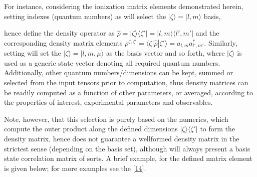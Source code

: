 \documentclass[letterpaper,table,10pt,english]{jupyterBook}
\begin{document}
\sphinxAtStartPar
For instance, considering the ionization matrix elements demonstrated herein, setting indexes (quantum numbers) as \sphinxcode{\sphinxupquote{{[}l,m{]}}} will select the \(|\zeta\rangle = |l,m\rangle\) basis,

\sphinxAtStartPar
hence define the density operator as \(\hat{\rho} = |\zeta\rangle \langle\zeta'| = |l,m\rangle\langle l',m'|\) and the corresponding density matrix elements \(\rho^{\zeta,\zeta'}=\langle\zeta|\hat{\rho}|\zeta'\rangle=a_{l,m}a_{l',m'}^{*}\). Similarly, setting \sphinxcode{\sphinxupquote{{[}'l','m','mu'{]}}} will set the \(|\zeta\rangle = |l,m,\mu\rangle\) as the basis vector and so forth, where \(|\zeta\rangle\) is used as a generic state vector denoting all required quantum numbers. Additionally, other quantum numbers/dimensions can be kept, summed or selected from the input tensors prior to computation, thus density matrices can be readily computed as a function of other parameters, or averaged, according to the properties of interest, experimental parameters and observables.

\sphinxAtStartPar
Note, however, that this selection is purely based on the numerics, which compute the outer product along the defined dimensions \(|\zeta\rangle\langle\zeta'|\) to form the density matrix, hence does not guarantee a well\sphinxhyphen{}formed density matrix in the strictest sense (depending on the basis set), although will always present a basis state correlation matrix of sorts. A brief example, for the  defined matrix element is given below; for more examples see the  {[}\hyperlink{cite.backmatter/bibliography:id506}{14}{]}.
\end{document}
